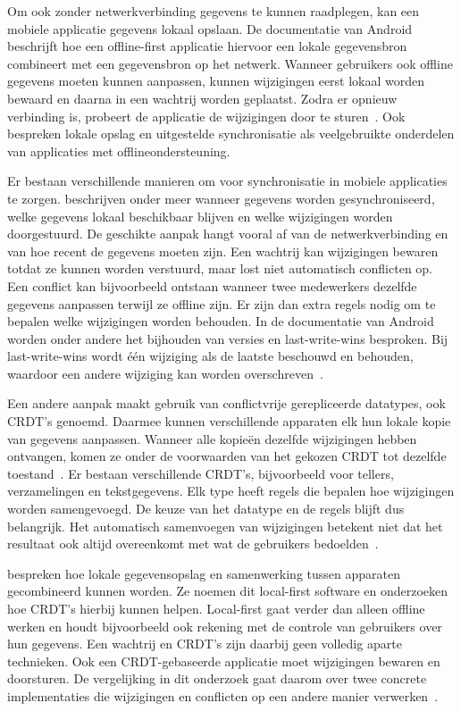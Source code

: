 Om ook zonder netwerkverbinding gegevens te kunnen raadplegen, kan een mobiele applicatie gegevens lokaal opslaan.
De documentatie van Android beschrijft hoe een offline-first applicatie hiervoor een lokale gegevensbron combineert met
een gegevensbron op het netwerk. Wanneer gebruikers ook offline gegevens moeten kunnen aanpassen, kunnen wijzigingen
eerst lokaal worden bewaard en daarna in een wachtrij worden geplaatst. Zodra er opnieuw verbinding is, probeert de
applicatie de wijzigingen door te sturen~\autocite{Google2026OfflineFirst}. Ook \textcite{NingrumEtAl2026} bespreken
lokale opslag en uitgestelde synchronisatie als veelgebruikte onderdelen van applicaties met offlineondersteuning.

Er bestaan verschillende manieren om voor synchronisatie in mobiele applicaties te zorgen.
\textcite{McCormickSchmidt2012} beschrijven onder meer wanneer gegevens worden gesynchroniseerd,
welke gegevens lokaal beschikbaar blijven en welke wijzigingen worden doorgestuurd. De geschikte
aanpak hangt vooral af van de netwerkverbinding en van hoe recent de gegevens moeten zijn.
Een wachtrij kan wijzigingen bewaren totdat ze kunnen worden verstuurd, maar lost niet automatisch conflicten op.
Een conflict kan bijvoorbeeld ontstaan wanneer twee medewerkers dezelfde gegevens aanpassen terwijl ze offline zijn.
Er zijn dan extra regels nodig om te bepalen welke wijzigingen worden behouden. In de documentatie van Android worden
onder andere het bijhouden van versies en last-write-wins besproken. Bij last-write-wins wordt één wijziging als de laatste
beschouwd en behouden, waardoor een andere wijziging kan worden overschreven~\autocite{Google2026OfflineFirst}.

Een andere aanpak maakt gebruik van conflictvrije gerepliceerde datatypes, ook CRDT's genoemd. Daarmee kunnen verschillende
apparaten elk hun lokale kopie van gegevens aanpassen. Wanneer alle kopieën dezelfde wijzigingen hebben ontvangen, komen ze 
onder de voorwaarden van het gekozen CRDT tot dezelfde toestand~\autocite{PreguicaEtAl2018}. Er bestaan verschillende CRDT's,
bijvoorbeeld voor tellers, verzamelingen en tekstgegevens. Elk type heeft regels die bepalen hoe wijzigingen worden samengevoegd.
De keuze van het datatype en de regels blijft dus belangrijk. Het automatisch samenvoegen van wijzigingen betekent niet dat
het resultaat ook altijd overeenkomt met wat de gebruikers bedoelden~\autocite{PreguicaEtAl2018}.

\textcite{KleppmannEtAl2019} bespreken hoe lokale gegevensopslag en samenwerking tussen apparaten gecombineerd kunnen worden.
Ze noemen dit local-first software en onderzoeken hoe CRDT's hierbij kunnen helpen. Local-first gaat verder dan
alleen offline werken en houdt bijvoorbeeld ook rekening met de controle van gebruikers over hun gegevens.
Een wachtrij en CRDT's zijn daarbij geen volledig
aparte technieken. Ook een CRDT-gebaseerde applicatie moet wijzigingen bewaren en doorsturen. De vergelijking in dit onderzoek
gaat daarom over twee concrete implementaties die wijzigingen en conflicten op een andere manier
verwerken~\autocite{PreguicaEtAl2018}.


